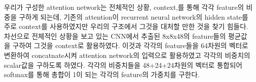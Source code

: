 우리가 구성한 attention network는 전체적인 상황, context,를 통해 각각 feature의 비중을 구하게 되는데, 기존의 attention이 recurrent neural network의 hidden state를 주로 context를 사용하였지만 우리의 구조에서 그것을 대처할 만한 것을 찾기 힘들다.
차선으로 전체적인 상황을 보고 있는 CNN에서 추출된 8x8x48의 feature들의 평균값을 구하여 그것을 context로 활용하였다.
이것과 각각의 feature들을 64차원의 벡터로 변환하여 concatnate시켜 attention network의 입력으로 활용하였고 각각의 비중치의 scalar값을 구하도록 하였다.
각각의 비중치들을 48+24+24차원의 벡터로 통합되어 softmax를 통해 총합이 1이 되는 각각의 feature의 가중치를 구한다.








